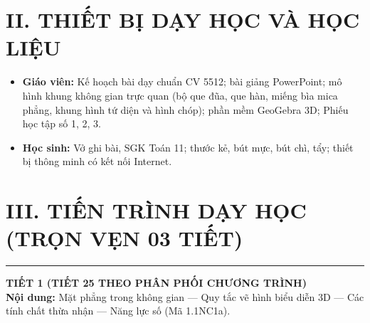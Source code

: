 \documentclass[12pt, a4paper]{article}
\begin{document}
\section*{II. THIẾT BỊ DẠY HỌC VÀ HỌC LIỆU}
\begin{itemize}[leftmargin=1.5em]
    \item \textbf{Giáo viên:} Kế hoạch bài dạy chuẩn CV 5512; bài giảng PowerPoint; mô hình khung không gian trực quan (bộ que đũa, que hàn, miếng bìa mica phẳng, khung hình tứ diện và hình chóp); phần mềm GeoGebra 3D; Phiếu học tập số 1, 2, 3.
    \item \textbf{Học sinh:} Vở ghi bài, SGK Toán 11; thước kẻ, bút mực, bút chì, tẩy; thiết bị thông minh có kết nối Internet.
\end{itemize}

\section*{III. TIẾN TRÌNH DẠY HỌC (TRỌN VẸN 03 TIẾT)}

\begin{center}
\end{center}

\vspace{0.8em}
\hrule
\vspace{0.8em}

{\large \textbf{TIẾT 1 (TIẾT 25 THEO PHÂN PHỐI CHƯƠNG TRÌNH)}}\\[0.3em]
\textbf{Nội dung:} Mặt phẳng trong không gian --- Quy tắc vẽ hình biểu diễn 3D --- Các tính chất thừa nhận --- Năng lực số (Mã 1.1NC1a).
\end{document}
